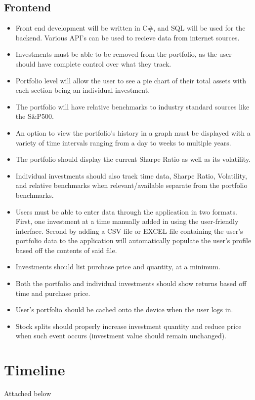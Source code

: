 \documentclass[onecolumn, draftclsnofoot,10pt, compsoc]{IEEEtran}
\begin{document}
\subsection{Frontend}
\begin{itemize}
	\item Front end development will be written in C\#, and SQL will be used for the backend. Various API's can be used to recieve data from internet sources.  
	\item Investments must be able to be removed from the portfolio, as the user should 
		have complete control over what they track. 
	\item Portfolio level will allow the user to see a pie chart of their total assets with each section being an individual investment.
	\item The portfolio will have relative benchmarks to industry standard sources like the S\&P500.
	\item An option to view the portfolio's history in a graph must be displayed with a variety of time intervals ranging from a day to weeks to multiple years.
	\item The portfolio should display the current Sharpe Ratio as well as its volatility.
	\item Individual investments should also track time data, Sharpe Ratio, Volatility, and relative benchmarks when relevant/available separate from the portfolio benchmarks.
	\item Users must be able to enter data through the application in two formats. First, one investment at a time manually added in using the user-friendly interface. Second by
		adding a CSV file or EXCEL file containing the user's portfolio data to the application will automatically populate the user's profile based off the contents of said file.
	\item Investments should list purchase price and quantity, at a minimum.
	\item Both the portfolio and individual investments should show returns based off time and purchase price.
	\item User's portfolio should be cached onto the device when the user logs in.
	\item Stock splits should properly increase investment quantity and reduce price when such event occurs (investment value should remain unchanged).

	
\end{itemize}
\section{Timeline}
Attached below

\end{document}
